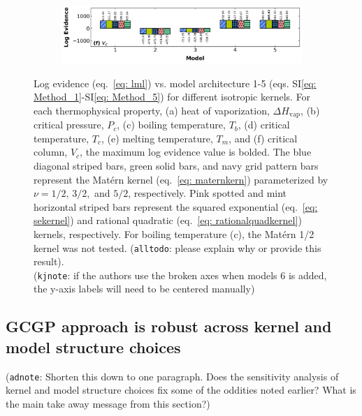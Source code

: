\documentclass[journal=jacsat,manuscript=article]{achemso}
\newcommand{\kjnote}[1]{{\color{Blue} (\texttt{kjnote}: #1)}}
\newcommand{\alltodo}[1]{{\color{Cyan} (\texttt{alltodo}: #1)}}
\newcommand{\adnote}[1]{{\color{OliveGreen} (\texttt{adnote}: #1)}}
\newcommand{\siref}[1]{SI\eqref{#1}}
\begin{document}
\begin{figure}
\begin{subfigure}[b]{0.75\textwidth}
     \end{subfigure}
     \hfill
     \begin{subfigure}[b]{0.75\textwidth}
         \centering
         \includegraphics[width=\textwidth]{images/lml_bar_chart_Vc.png}
     \end{subfigure}
     \caption{Log evidence (eq.~\eqref{eq: lml}) vs. model architecture 1-5 (eqs. \siref{eq: Method_1}-\siref{eq: Method_5}) for different isotropic kernels. For each thermophysical property, (a) heat of vaporization, $\Delta H_{\text{vap}}$, (b) critical pressure, $P_c$, (c) boiling temperature, $T_b$, (d) critical temperature, $T_c$, (e) melting temperature, $T_m$, and (f) critical column, $V_c$, the maximum log evidence value is bolded. The blue diagonal striped bars, green solid bars, and navy grid pattern bars represent the Mat\'ern kernel (eq.~\eqref{eq: maternkern}) parameterized by $\nu = 1/2, \, 3/2,$ and $5/2$, respectively. Pink spotted and mint horizontal striped bars represent the squared exponential (eq.~\eqref{eq: sekernel}) and rational quadratic (eq.~\eqref{eq: rationalquadkernel}) kernels, respectively. For boiling temperature (c), the Mat\'ern 1/2 kernel was not tested.
     \alltodo{please explain why or provide this result}. \\
     \kjnote{if the authors use the broken axes when models 6 is added, the y-axis labels will need to be centered manually}}
     \label{fig: lmlbarchart}
\end{figure}
\FloatBarrier

\subsection{GCGP approach is robust across kernel and model structure choices} \label{sec:kern_sweep}

\adnote{Shorten this down to one paragraph. Does the sensitivity analysis of kernel and model structure choices fix some of the oddities noted earlier? What is the main take away message from this section?}
\end{document}
